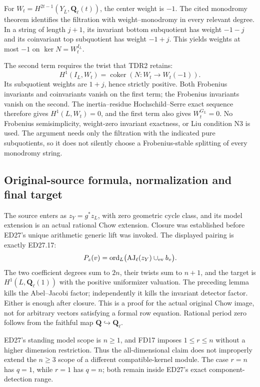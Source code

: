 For $W_t=H^{2t-1}(Y_{\bar L},\mathbf Q_\ell(t))$, the center weight
is $-1$. The cited monodromy theorem identifies the filtration with
weight--monodromy in every relevant degree. In a string of length
$j+1$, its invariant bottom subquotient has weight $-1-j$ and its
coinvariant top subquotient has weight $-1+j$. This yields weights
at most $-1$ on $\ker N=W_t^{I_L}$.

The second term requires the twist that TDR2 retains:
\[
 H^1(I_L,W_t)=\operatorname{coker}(N:W_t\longrightarrow W_t(-1)).
\]
Its subquotient weights are $1+j$, hence strictly positive. Both
Frobenius invariants and coinvariants vanish on the first term; the
Frobenius invariants vanish on the second. The inertia--residue
Hochschild--Serre exact sequence therefore gives $H^1(L,W_t)=0$,
and the first term also gives $W_t^{G_L}=0$. No Frobenius
semisimplicity, weight-zero invariant exactness, or Liu condition N3
is used. The argument needs only the filtration with the indicated
pure subquotients, so it does not silently choose a Frobenius-stable
splitting of every monodromy string.

\subsection{Original-source formula, normalization and final target}

The source enters as $z_Y=g^*z_L$, with zero geometric cycle class,
and its model extension is an actual rational Chow extension.
Closure was established before ED27's unique arithmetic generic lift
was invoked. The displayed pairing is exactly ED27.17:
\[
 P_z(v)=\operatorname{ord}_L
       \bigl(\operatorname{AJ}_\ell(z_Y)\cup_{\rm ev} b_v\bigr).
\]
The two coefficient degrees sum to $2n$, their twists sum to $n+1$,
and the target is $H^1(L,\mathbf Q_\ell(1))$ with the positive
uniformizer valuation. The preceding lemma kills the Abel--Jacobi
factor; independently it kills the invariant detector factor. Either
is enough after closure. This is a proof for the actual original
Chow image, not for arbitrary vectors satisfying a formal row equation.
Rational period zero follows from the faithful map
$\mathbf Q\hookrightarrow\mathbf Q_\ell$.

ED27's standing model scope is $n\geq1$, and FD17 imposes
$1\leq r\leq n$ without a higher dimension restriction. Thus the
all-dimensional claim does not improperly extend the $n\geq3$
scope of a different compatible-kernel module. The case $r=n$ has
$q=1$, while $r=1$ has $q=n$; both remain inside ED27's exact
component-detection range.


